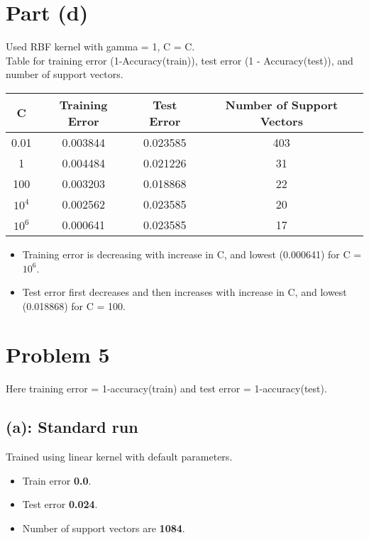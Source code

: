 \documentclass[12pt]{article}
\begin{document}
\section*{Part (d)}
Used RBF kernel with gamma = 1, C = C. \\
Table for training error (1-Accuracy(train)), test error (1 - Accuracy(test)), and number of support vectors.
\begin{center}
    \begin{tabular}{|c|c|c|c|}
        \hline
        \textbf{C} & \textbf{Training Error} & \textbf{Test Error} & \textbf{Number of Support Vectors} \\
        \hline
        0.01 & 0.003844 & 0.023585 & 403 \\
        1 & 0.004484 & 0.021226 & 31 \\
        100 & 0.003203 & 0.018868 & 22 \\
        $10^4$ & 0.002562 & 0.023585 & 20 \\
        $10^6$ & 0.000641 & 0.023585 & 17 \\
        \hline
    \end{tabular}
\end{center}

\begin{itemize}
    \item Training error is decreasing with increase in C, and lowest (0.000641) for C = $10^6$.
    \item Test error first decreases and then increases with increase in C, and lowest (0.018868) for C = 100.
\end{itemize}

\section*{Problem 5}
Here training error = 1-accuracy(train) and test error = 1-accuracy(test).
\subsection*{(a): Standard run}
Trained using linear kernel with default parameters. 
\begin{itemize}
    \item Train error  \textbf{0.0}.
    \item Test error  \textbf{0.024}.
    \item Number of support vectors are \textbf{1084}.
\end{itemize}
\end{document}
